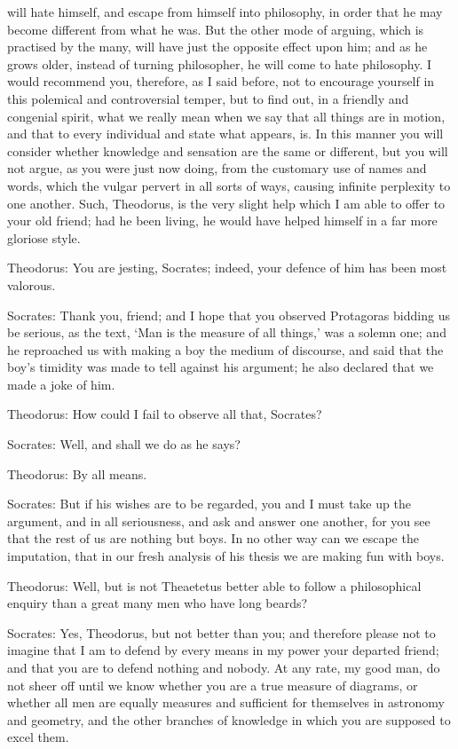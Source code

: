 will hate himself, and escape from himself into philosophy, in order
that he may become different from what he was. But the other mode of
arguing, which is practised by the many, will have just the opposite
effect upon him; and as he grows older, instead of turning philosopher,
he will come to hate philosophy. I would recommend you, therefore, as
I said before, not to encourage yourself in this polemical and
controversial temper, but to find out, in a friendly and congenial
spirit, what we really mean when we say that all things are in motion,
and that to every individual and state what appears, is. In this manner
you will consider whether knowledge and sensation are the same or
different, but you will not argue, as you were just now doing, from the
customary use of names and words, which the vulgar pervert in all sorts
of ways, causing infinite perplexity to one another. Such, Theodorus, is
the very slight help which I am able to offer to your old friend; had he
been living, he would have helped himself in a far more gloriose style.

Theodorus: You are jesting, Socrates; indeed, your defence of him has
been most valorous.

Socrates: Thank you, friend; and I hope that you observed Protagoras
bidding us be serious, as the text, `Man is the measure of all things,'
was a solemn one; and he reproached us with making a boy the medium of
discourse, and said that the boy's timidity was made to tell against his
argument; he also declared that we made a joke of him.

Theodorus: How could I fail to observe all that, Socrates?

Socrates: Well, and shall we do as he says?

Theodorus: By all means.

Socrates: But if his wishes are to be regarded, you and I must take up
the argument, and in all seriousness, and ask and answer one another,
for you see that the rest of us are nothing but boys. In no other way
can we escape the imputation, that in our fresh analysis of his thesis
we are making fun with boys.

Theodorus: Well, but is not Theaetetus better able to follow a
philosophical enquiry than a great many men who have long beards?

Socrates: Yes, Theodorus, but not better than you; and therefore please
not to imagine that I am to defend by every means in my power your
departed friend; and that you are to defend nothing and nobody. At any
rate, my good man, do not sheer off until we know whether you are a
true measure of diagrams, or whether all men are equally measures and
sufficient for themselves in astronomy and geometry, and the other
branches of knowledge in which you are supposed to excel them.

